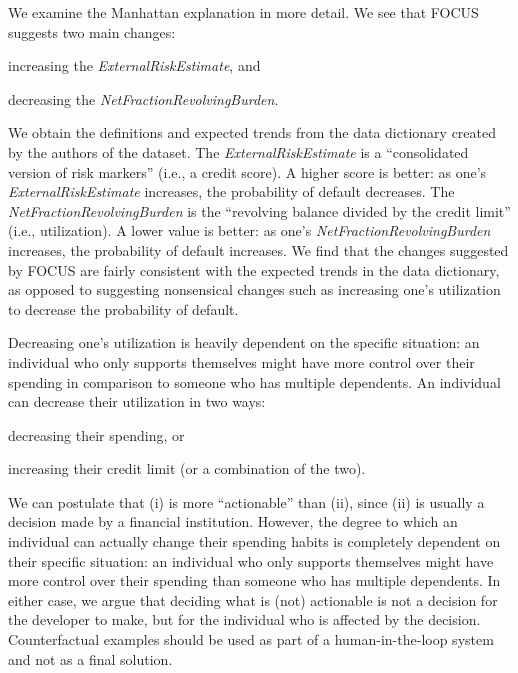 We examine the Manhattan explanation in more detail. 
We see that FOCUS suggests two main changes: 
\begin{inparaenum}[(i)]
	\item increasing the \textit{ExternalRiskEstimate}, and 
	\item decreasing the \textit{NetFractionRevolvingBurden}. 
\end{inparaenum}
We obtain the definitions and expected trends from the data dictionary created by the authors of the dataset. 
The \emph{ExternalRiskEstimate} is a ``consolidated version of risk markers'' (i.e., a credit score). 
A higher score is better: as one's \emph{ExternalRiskEstimate} increases, the probability of default decreases. 
The \textit{NetFractionRevolvingBurden} is the ``revolving balance divided by the credit limit'' (i.e., utilization). 
A lower value is better: as one's \emph{NetFractionRevolvingBurden} increases, the probability of default increases. 
We find that the changes suggested by FOCUS are fairly consistent with the expected trends in the data dictionary, as opposed to suggesting nonsensical changes such as increasing one's utilization to decrease the probability of default. 


Decreasing one's utilization is heavily dependent on the specific situation: an individual who only supports themselves might have more control over their spending in comparison to someone who has multiple dependents. 
An individual can decrease their utilization in two ways: 
\begin{inparaenum}[(i)]
	\item decreasing their spending, or
	\item increasing their credit limit (or a combination of the two).
\end{inparaenum}
We can postulate that (i) is more ``actionable'' than (ii), since (ii) is usually a decision made by a financial institution. 
However, the degree to which an individual can actually change their spending habits is completely dependent on their specific situation: an individual who only supports themselves might have more control over their spending than someone who has multiple dependents. 
In either case, we argue that deciding what is (not) actionable is not a decision for the developer to make, but for the individual who is affected by the decision. 
Counterfactual examples should be used as part of a human-in-the-loop system and not as a final solution. 

